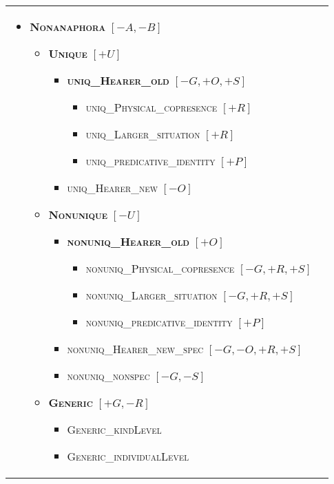 \documentclass[11pt,letterpaper]{article}
\newcommand{\ilbl}[1]{\mbox{\textbf{\textsc{#1}}}} %
\newcommand{\llbl}[1]{\mbox{\textsc{#1}}} %
\begin{document}
\begin{figure*}\small
\begin{tabular}{p{}p{}}
\begin{itemize}
\item    \ilbl{Nonanaphora} $[-A,-B]$
  \begin{itemize}
  \item      \ilbl{Unique} $[+U]$
    \begin{itemize}
    \item        \ilbl{uniq\_Hearer\_old} $[-G,+O,+S]$
      \begin{itemize}
      \item          \llbl{uniq\_Physical\_copresence} $[+R]$
      \item          \llbl{uniq\_Larger\_situation} $[+R]$
      \item          \llbl{uniq\_predicative\_identity} $[+P]$
      \end{itemize}
    \item        \llbl{uniq\_Hearer\_new} $[-O]$
    \end{itemize}
   \item     \ilbl{Nonunique} $[-U]$
     \begin{itemize}
     \item       \ilbl{nonuniq\_Hearer\_old} $[+O]$
       \begin{itemize}
       \item         \llbl{nonuniq\_Physical\_copresence} $[-G,+R,+S]$
       \item         \llbl{nonuniq\_Larger\_situation} $[-G,+R,+S]$
       \item         \llbl{nonuniq\_predicative\_identity} $[+P]$
       \end{itemize}
     \item       \llbl{nonuniq\_Hearer\_new\_spec} $[-G,-O,+R,+S]$
     \item       \llbl{nonuniq\_nonspec} $[-G,-S]$
     \end{itemize}
   \item \ilbl{Generic} $[+G,-R]$
     \begin{itemize}
	   \item      \llbl{Generic\_kindLevel}
	   \item      \llbl{Generic\_individualLevel}
     \end{itemize}
  \end{itemize}
\end{itemize} &
\begin{itemize}

\end{itemize}
\end{tabular}
\end{figure*}
\end{document}

